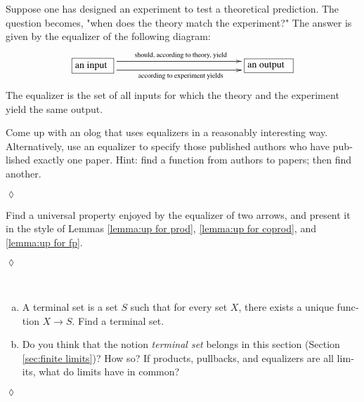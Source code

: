 \documentclass{book}
\def\tn{\textnormal}
\def\to{\rightarrow}
\newcommand{\obox}[3]{\stackrel{#1}{\fbox{\parbox{#2}{#3}}}}
\def\Set{{\bf Set}}
\theoremstyle{theoremENG}
\theoremstyle{lemmaENG}
\theoremstyle{propositionENG}
\theoremstyle{corollaryENG}
\theoremstyle{factENG}
\theoremstyle{remarkENG}
\theoremstyle{exampleENG}
\newtheorem{exampleENG}[subsubsection]{\begin{english}Example\end{english}}
\theoremstyle{warningENG}
\theoremstyle{questionENG}
\theoremstyle{guessENG}
\theoremstyle{answerENG}
\theoremstyle{constructionENG}
\theoremstyle{rulesENG}
\theoremstyle{excENG}
\newtheorem{excENG}[subsubsection]{\begin{english}Exercise\end{english}}
\theoremstyle{appENG}
\theoremstyle{definitionENG}
\newtheorem{definitionENG}[subsubsection]{\begin{english}Definition\end{english}}
\theoremstyle{notationENG}
\theoremstyle{conjectureENG}
\theoremstyle{postulateENG}
\newenvironment{exerciseENG}{\begin{excENG}}{\hspace*{\fill}$\lozenge$\end{excENG}}
\theoremstyle{theoremRUS}
\theoremstyle{lemmaRUS}
\theoremstyle{propositionRUS}
\theoremstyle{corollaryRUS}
\theoremstyle{factRUS}
\theoremstyle{remarkRUS}
\theoremstyle{exampleRUS}
\theoremstyle{warningRUS}
\theoremstyle{questionRUS}
\theoremstyle{guessRUS}
\theoremstyle{answerRUS}
\theoremstyle{constructionRUS}
\theoremstyle{rulesRUS}
\theoremstyle{excRUS}
\theoremstyle{appRUS}
\theoremstyle{definitionRUS}
\theoremstyle{notationRUS}
\theoremstyle{conjectureRUS}
\theoremstyle{postulateRUS}
\def\sexc{\begin{enumerate}[a.)]\setlength{\itemsep}{.1cm}\setlength{\parskip}{.1cm}\item}
\def\next{\item}
\def\endsexc{\end{enumerate}}
\begin{document}
\begin{english}
\begin{definitionENG}
\begin{russian} \end{russian}

\end{definitionENG}

\begin{exampleENG}

Suppose one has designed an experiment to test a theoretical prediction. The question becomes, "when does the theory match the experiment?" The answer is given by the equalizer of the following diagram:
$$\xymatrix{
\obox{}{.5in}{an input}\ar@<1ex>[rr]^{\tn{should, according to theory, yield}}\ar@<-1ex>[rr]_{\tn{according to experiment yields}}&\hspace{1in}&\obox{}{.6in}{an output}
}$$
The equalizer is the set of all inputs for which the theory and the experiment yield the same output.

\begin{russian} \end{russian}

\end{exampleENG}

\begin{exerciseENG}

Come up with an olog that uses equalizers in a reasonably interesting way. Alternatively, use an equalizer to specify those published authors who have published exactly one paper. Hint: find a function from authors to papers; then find another.

\begin{russian} \end{russian}

\end{exerciseENG}

\begin{exerciseENG}

Find a universal property enjoyed by the equalizer of two arrows, and present it in the style of Lemmas \ref{lemma:up for prod}, \ref{lemma:up for coprod}, and \ref{lemma:up for fp}.

\begin{russian} \end{russian}

\end{exerciseENG}

\begin{exerciseENG}\index{terminal object!in $\Set$}~

\sexc A terminal set is a set $S$ such that for every set $X$, there exists a unique function $X\to S$. Find a terminal set. 
\next Do you think that the notion {\em terminal set} belongs in this section (Section \ref{sec:finite limits})? How so? If products, pullbacks, and equalizers are all limits, what do limits have in common?
\endsexc


\end{exerciseENG}
\end{english}
\end{document}
